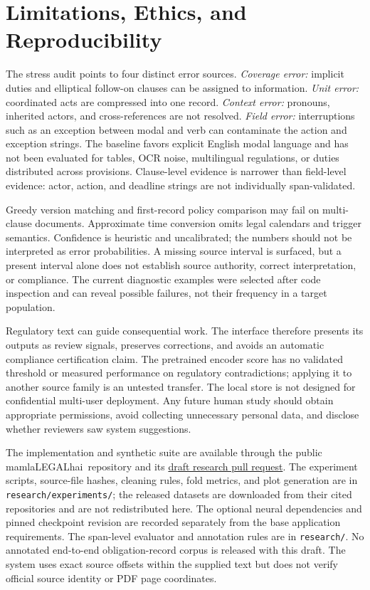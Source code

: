 \documentclass[11pt,a4paper]{article}
\newcommand{\system}{\textsf{mamlaLEGALhai}}
\newcommand{\field}[1]{\texttt{#1}}
\begin{document}
\section{Limitations, Ethics, and Reproducibility}
The stress audit points to four distinct error sources. \emph{Coverage error:} implicit duties and elliptical follow-on clauses can be assigned to information. \emph{Unit error:} coordinated acts are compressed into one record. \emph{Context error:} pronouns, inherited actors, and cross-references are not resolved. \emph{Field error:} interruptions such as an exception between modal and verb can contaminate the action and exception strings. The baseline favors explicit English modal language and has not been evaluated for tables, OCR noise, multilingual regulations, or duties distributed across provisions. Clause-level evidence is narrower than field-level evidence: actor, action, and deadline strings are not individually span-validated.

Greedy version matching and first-record policy comparison may fail on multi-clause documents. Approximate time conversion omits legal calendars and trigger semantics. Confidence is heuristic and uncalibrated; the numbers should not be interpreted as error probabilities. A missing source interval is surfaced, but a present interval alone does not establish source authority, correct interpretation, or compliance. The current diagnostic examples were selected after code inspection and can reveal possible failures, not their frequency in a target population.

Regulatory text can guide consequential work. The interface therefore presents its outputs as review signals, preserves corrections, and avoids an automatic compliance certification claim. The pretrained encoder score has no validated threshold or measured performance on regulatory contradictions; applying it to another source family is an untested transfer. The local store is not designed for confidential multi-user deployment. Any future human study should obtain appropriate permissions, avoid collecting unnecessary personal data, and disclose whether reviewers saw system suggestions.

The implementation and synthetic suite are available through the public \system\ repository and its \href{https://github.com/trayee05/regulatrace-compliance-intelligence/pull/1}{draft research pull request}. The experiment scripts, source-file hashes, cleaning rules, fold metrics, and plot generation are in \field{research/experiments/}; the released datasets are downloaded from their cited repositories and are not redistributed here. The optional neural dependencies and pinned checkpoint revision are recorded separately from the base application requirements. The span-level evaluator and annotation rules are in \field{research/}. No annotated end-to-end obligation-record corpus is released with this draft. The system uses exact source offsets within the supplied text but does not verify official source identity or PDF page coordinates.
\end{document}
